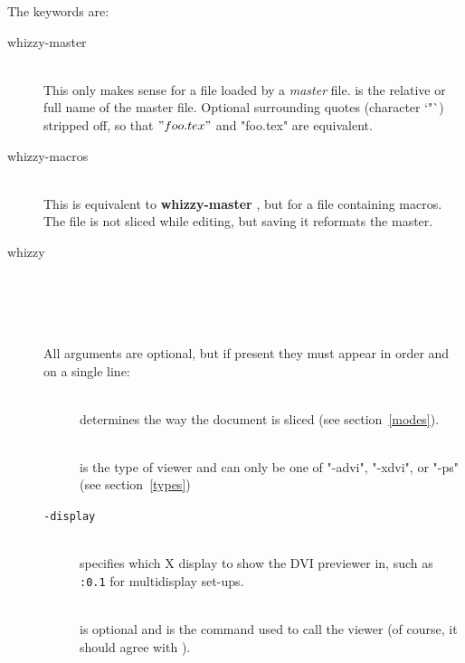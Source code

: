 \documentclass[12pt]{article}
\begin{document}
The keywords are:
\begin{description}
\item[whizzy-master]
\\
This only makes sense for a file loaded by a {\em master} file. 
 is the relative or full name of the
master file. Optional surrounding quotes (character \lst`"`) %
%
stripped off, so that \lst$"foo.tex"$ and \lst"foo.tex" are equivalent.

\item[whizzy-macros]
\\
  This is equivalent to {\bf whizzy-master} , but for a file
  containing   macros. The file is not sliced while editing, but 
  saving it reformats the master. 

\item[whizzy] 
\\
 \\
\\
\\[1em]
All arguments are optional, but if present they must appear in order and on
a single line:
\begin{description}
\item[]\indent\\ 
determines the way the document is sliced
(see section~\ref{modes}).

\item[]\indent\\
is the type of viewer and can only be one of 
\lst"-advi", \lst"-xdvi", or \lst"-ps" (see section~\ref{types})

\item[\texttt{-display} ]\indent\\
specifies which X display to show the DVI previewer in,
such as \texttt{:0.1} for multidisplay set-ups.

\item[]\indent\\
is optional and is the command used to call the viewer
(of course, it should agree with ). 


\end{description}
\end{description}
\end{document}
